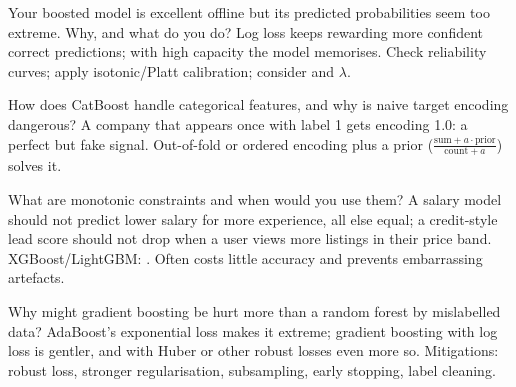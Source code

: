 \begin{qa}{\deep Your boosted model is excellent offline but its predicted probabilities seem too extreme. Why, and what do you do?}
\why Log loss keeps rewarding more confident correct predictions; with high capacity the model memorises. Check reliability curves;
apply isotonic/Platt calibration; consider  and $\lambda$.
\end{qa}

\begin{qa}{How does CatBoost handle categorical features, and why is naive target encoding dangerous?}
\why A company that appears once with label 1 gets encoding 1.0: a perfect but fake signal. Out-of-fold or ordered encoding plus
a prior ($\frac{\text{sum} + a\cdot\text{prior}}{\text{count} + a}$) solves it.
\end{qa}

\begin{qa}{What are monotonic constraints and when would you use them?}
\why A salary model should not predict lower salary for more experience, all else equal; a credit-style lead score should not drop when
a user views more listings in their price band. XGBoost/LightGBM: . Often costs little accuracy and prevents
embarrassing artefacts.
\end{qa}

\begin{qa}{\deep Why might gradient boosting be hurt more than a random forest by mislabelled data?}
\why AdaBoost's exponential loss makes it extreme; gradient boosting with log loss is gentler, and with Huber or other robust losses even
more so. Mitigations: robust loss, stronger regularisation, subsampling, early stopping, label cleaning.
\end{qa}

